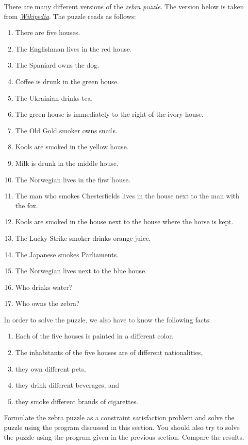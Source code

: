 \exercise
There are many different versions of the \href{https://en.wikipedia.org/wiki/Zebra_Puzzle}{\emph{zebra puzzle}}.  
The version below is taken from \href{https://en.wikipedia.org/wiki/Zebra_Puzzle}{\emph{Wikipedia}}.  The
puzzle reads as follows:
\begin{enumerate}
\item There are five houses.
\item The Englishman lives in the red house.
\item The Spaniard owns the dog.
\item Coffee is drunk in the green house.
\item The Ukrainian drinks tea.
\item The green house is immediately to the right of the ivory house.
\item The Old Gold smoker owns snails.
\item Kools are smoked in the yellow house.
\item Milk is drunk in the middle house.
\item The Norwegian lives in the first house.
\item The man who smokes Chesterfields lives in the house next to the man with the fox.
\item Kools are smoked in the house next to the house where the horse is kept.
\item The Lucky Strike smoker drinks orange juice.
\item The Japanese smokes Parliaments.
\item The Norwegian lives next to the blue house.
\item Who drinks water? 
\item Who owns the zebra?
\end{enumerate}
In order to solve the puzzle, we also have to know the following facts:
\begin{enumerate}
\item Each of the five houses is painted in a {\color{blue}different} color.
\item The inhabitants of the five houses are of {\color{blue}different} nationalities,
\item they own {\color{blue}different} pets, 
\item they drink {\color{blue}different} beverages, and 
\item they smoke {\color{blue}different} brands of cigarettes. 
\end{enumerate}
Formulate the zebra puzzle as a constraint satisfaction problem and solve the puzzle using the program
discussed in this section.  You should also try to solve the puzzle using the program given in the previous
section.  Compare the results.
\eoxs

